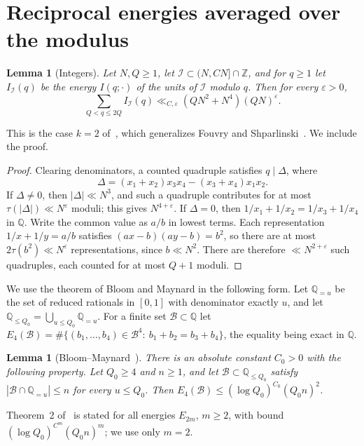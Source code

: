 \documentclass[11pt]{amsart}
\newtheorem{lemma}[theorem]{Lemma}
\theoremstyle{definition}
\theoremstyle{remark}
\numberwithin{equation}{section}
\newcommand{\Z}{\mathbb Z}
\newcommand{\Q}{\mathbb Q}
\newcommand{\eps}{\varepsilon}
\begin{document}
\section{Reciprocal energies averaged over the modulus}\label{sec:energy}

\begin{lemma}[Integers]\label{lem:energy-integers}
Let $N,Q\ge1$, let $\mathcal I\subset(N,CN]\cap\Z$, and for $q\ge1$ let
$I_{\mathcal I}(q)$ be the energy $I(q;\cdot)$ of the units of $\mathcal I$
modulo $q$.  Then for every $\eps>0$,
\[
 \sum_{Q<q\le2Q}I_{\mathcal I}(q)\ll_{C,\eps}(QN^2+N^4)(QN)^{\eps}.
\]
\end{lemma}

This is the case $k=2$ of~\cite[Lemma~2.3]{Irv14}, which generalizes
Fouvry and Shparlinski~\cite[Lemma~3]{FS11}.  We include the proof.

\begin{proof}
Clearing denominators, a counted quadruple satisfies $q\mid\Delta$, where
\[
 \Delta=(x_1+x_2)x_3x_4-(x_3+x_4)x_1x_2 .
\]
If $\Delta\ne0$, then $|\Delta|\ll N^3$, and such a quadruple contributes
for at most $\tau(|\Delta|)\ll N^{\eps}$ moduli; this gives $N^{4+\eps}$.
If $\Delta=0$, then $1/x_1+1/x_2=1/x_3+1/x_4$ in $\Q$.  Write the common
value as $a/b$ in lowest terms.  Each representation
$1/x+1/y=a/b$ satisfies $(ax-b)(ay-b)=b^2$, so there are at most
$2\tau(b^2)\ll N^{\eps}$ representations, since $b\ll N^2$.  There are
therefore $\ll N^{2+\eps}$ such quadruples, each counted for at most $Q+1$
moduli.
\end{proof}

We use the theorem of Bloom and Maynard in the following form.  Let
$\Q_{=u}$ be the set of reduced rationals in $[0,1]$ with denominator exactly
$u$, and let $\Q_{\le Q_0}=\bigcup_{u\le Q_0}\Q_{=u}$.  For a finite set
$\mathcal B\subset\Q$ let
$E_4(\mathcal B)=\#\{(b_1,\dots,b_4)\in\mathcal B^4:\ b_1+b_2=b_3+b_4\}$,
the equality being exact in $\Q$.

\begin{lemma}[{Bloom--Maynard~\cite[Theorem~2]{BM}}]\label{lem:BM}
There is an absolute constant $C_0>0$ with the following property.  Let
$Q_0\ge4$ and $n\ge1$, and let $\mathcal B\subset\Q_{\le Q_0}$ satisfy
$|\mathcal B\cap\Q_{=u}|\le n$ for every $u\le Q_0$.  Then
$E_4(\mathcal B)\le(\log Q_0)^{C_0}(Q_0n)^2$.
\end{lemma}

Theorem~2 of~\cite{BM} is stated for all energies $E_{2m}$, $m\ge2$, with
bound $(\log Q_0)^{C^m}(Q_0n)^m$; we use only $m=2$.
\end{document}
